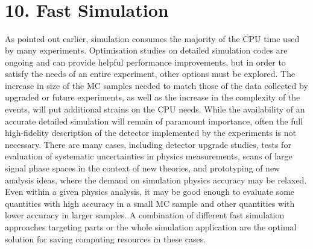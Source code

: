 \documentclass[12pt,a4paper]{article}
\begin{document}
\hypertarget{section-5}{%
\section{}\label{section-5}}

\hypertarget{section-6}{%
\section{\texorpdfstring{\\
}{ }}\label{section-6}}

\hypertarget{fast-simulation}{%
\section{10. Fast Simulation}\label{fast-simulation}}

As pointed out earlier, simulation consumes the majority of the CPU time
used by many experiments. Optimisation studies on detailed simulation
codes are ongoing and can provide helpful performance improvements, but
in order to satisfy the needs of an entire experiment, other options
must be explored. The increase in size of the MC samples needed to match
those of the data collected by upgraded or future experiments, as well
as the increase in the complexity of the events, will put additional
strains on the CPU needs. While the availability of an accurate detailed
simulation will remain of paramount importance, often the full
high-fidelity description of the detector implemented by the experiments
is not necessary. There are many cases, including detector upgrade
studies, tests for evaluation of systematic uncertainties in physics
measurements, scans of large signal phase spaces in the context of new
theories, and prototyping of new analysis ideas, where the demand on
simulation physics accuracy may be relaxed. Even within a given physics
analysis, it may be good enough to evaluate some quantities with high
accuracy in a small MC sample and other quantities with lower accuracy
in larger samples. A combination of different fast simulation approaches
targeting parts or the whole simulation application are the optimal
solution for saving computing resources in these cases.
\end{document}
